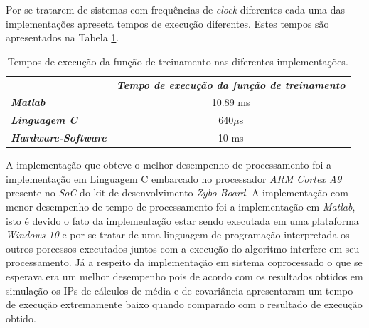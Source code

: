 Por se tratarem de sistemas com frequências de \textit{clock} diferentes cada uma das implementações apreseta tempos de execução diferentes. Estes tempos são apresentados na Tabela \ref{tempos}. 

\begin{table}[!h]
	\centering
	\caption{Tempos de execução da função de treinamento nas diferentes implementações.}
	\label{tempos}
	\begin{tabular}{lc}
		\rowcolor[HTML]{DAE8FC} 
		\multicolumn{1}{c}{\cellcolor[HTML]{DAE8FC}\textbf{Implementação}} & \textit{\textbf{Tempo de execução da função de treinamento}} \\
		\textit{\textbf{Matlab}}                                           & 10.89 ms                                                     \\
		\rowcolor[HTML]{DAE8FC} 
		\textit{\textbf{Linguagem C}}                                      & 640$\mu$s                                                 \\
		\textit{\textbf{Hardware-Software}}                                & 10 ms                                                       
	\end{tabular}
\end{table}

A implementação que obteve o melhor desempenho de processamento foi a implementação em Linguagem C embarcado no processador \textit{ARM Cortex A9} presente no \textit{SoC} do kit de desenvolvimento \textit{Zybo Board}. A implementação com menor desempenho de tempo de processamento foi a implementação em \textit{Matlab}, isto é devido o fato da implementação estar sendo executada em uma plataforma \textit{Windows 10} e por se tratar de uma linguagem de programação interpretada os outros porcessos executados juntos com a execução do algoritmo interfere em seu processamento. Já a respeito da implementação em sistema coprocessado o que se esperava era um melhor desempenho pois de acordo com os resultados obtidos em simulação os IPs de cálculos de média e de covariância apresentaram um tempo de execução extremamente baixo quando comparado com o resultado de execução obtido.
